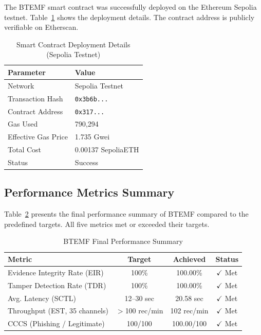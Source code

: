 \documentclass[conference]{IEEEtran}
\begin{document}
The BTEMF smart contract was successfully deployed on the Ethereum Sepolia testnet. Table~\ref{tab:deployment} shows the deployment details. The contract address is publicly verifiable on Etherscan.

\begin{table}[!h]
\centering
\caption{Smart Contract Deployment Details (Sepolia Testnet)}
\label{tab:deployment}
\begin{tabular}{|l|l|}
\hline
\textbf{Parameter} & \textbf{Value} \\
\hline
Network & Sepolia Testnet \\
Transaction Hash & \texttt{0x3b6b...} \\
Contract Address & \texttt{0x317...} \\
Gas Used & 790,294 \\
Effective Gas Price & 1.735 Gwei \\
Total Cost & 0.00137 SepoliaETH \\
Status & Success \\
\hline
\end{tabular}
\end{table}

\subsection{Performance Metrics Summary}

Table~\ref{tab:summary} presents the final performance summary of BTEMF compared to the predefined targets. All five metrics met or exceeded their targets.

\begin{table}[!h]
\centering
\caption{BTEMF Final Performance Summary}
\label{tab:summary}
\renewcommand{\arraystretch}{1.2}
\begin{tabular}{|l|c|c|c|}
\hline
\textbf{Metric} & \textbf{Target} & \textbf{Achieved} & \textbf{Status} \\
\hline
Evidence Integrity Rate (EIR) & 100\% & 100.00\% & $\checkmark$ Met \\
Tamper Detection Rate (TDR)   & 100\% & 100.00\% & $\checkmark$ Met \\
Avg. Latency (SCTL)           & 12–30 sec & 20.58 sec & $\checkmark$ Met \\
Throughput (EST, 35 channels) & $>$100 rec/min & 102 rec/min & $\checkmark$ Met \\
CCCS (Phishing / Legitimate)  & 100/100   & 100.00/100 & $\checkmark$ Met \\
\hline
\end{tabular}
\end{table}
\end{document}

